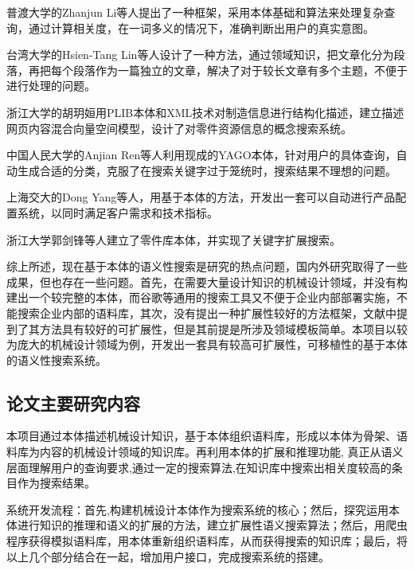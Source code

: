 \documentclass[12pt,a4paper]{article}
\begin{document}
	普渡大学的{\Times Zhanjun Li}等人提出了一种框架，采用本体基础和算法来处理复杂查询，通过计算相关度，在一词多义的情况下，准确判断出用户的真实意图\cite{18}。

	台湾大学的{\Times Hsien-Tang Lin}等人设计了一种方法，通过领域知识，把文章化分为段落，再把每个段落作为一篇独立的文章，解决了对于较长文章有多个主题，不便于进行处理的问题\cite{19}。

	浙江大学的胡玥姮用{\Times PLIB}本体和{\Times XML}技术对制造信息进行结构化描述，建立描述网页内容混合向量空间模型，设计了对零件资源信息的概念搜索系统。

	中国人民大学的{\Times Anjian Ren}等人利用现成的{\Times YAGO}本体，针对用户的具体查询，自动生成合适的分类，克服了在搜索关键字过于笼统时，搜索结果不理想的问题\cite{20}。

	上海交大的{\Times Dong Yang}等人，用基于本体的方法，开发出一套可以自动进行产品配置系统，以同时满足客户需求和技术指标\cite{21}。

	浙江大学郭剑锋等人建立了零件库本体，并实现了关键字扩展搜索\cite{22}。

	综上所述，现在基于本体的语义性搜索是研究的热点问题，国内外研究取得了一些成果，但也存在一些问题。首先，在需要大量设计知识的机械设计领域，并没有构建出一个较完整的本体，而谷歌等通用的搜索工具又不便于企业内部部署实施，不能搜索企业内部的语料库，其次，没有提出一种扩展性较好的方法框架，文献\cite{15}中提到了其方法具有较好的可扩展性，但是其前提是所涉及领域模板简单。本项目以较为庞大的机械设计领域为例，开发出一套具有较高可扩展性，可移植性的基于本体的语义性搜索系统。
		
	\subsection{论文主要研究内容}
	本项目通过本体描述机械设计知识，基于本体组织语料库，形成以本体为骨架、语料库为内容的机械设计领域的知识库。再利用本体的扩展和推理功能, 真正从语义层面理解用户的查询要求,通过一定的搜索算法,在知识库中搜索出相关度较高的条目作为搜索结果。
	
	系统开发流程：首先,构建机械设计本体作为搜索系统的核心；然后，探究运用本体进行知识的推理和语义的扩展的方法，建立扩展性语义搜索算法；然后，用爬虫程序获得模拟语料库，用本体重新组织语料库，从而获得搜索的知识库；最后，将以上几个部分结合在一起，增加用户接口，完成搜索系统的搭建。
\end{document}

